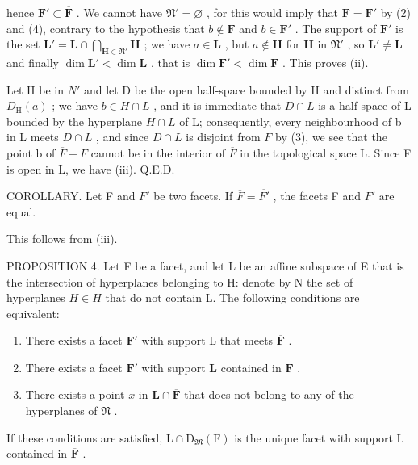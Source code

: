 hence \(\mathbf{F}' \subset \overline{\mathbf{F}}\) . We cannot have \(\mathfrak{N}' = \varnothing\) , for this would imply that \(\mathbf{F} = \mathbf{F}'\) by (2) and (4), contrary to the hypothesis that \(b \notin \mathbf{F}\) and \(b \in \mathbf{F}'\) . The support of \(\mathbf{F}'\) is the set \(\mathbf{L}' = \mathbf{L} \cap \bigcap_{\mathbf{H} \in \mathfrak{N}'} \mathbf{H}\) ; we have \(a \in \mathbf{L}\) , but \(a \notin \mathbf{H}\) for \(\mathbf{H}\) in \(\mathfrak{N}'\) , so \(\mathbf{L}' \neq \mathbf{L}\) and finally \(\dim \mathbf{L}' < \dim \mathbf{L}\) , that is \(\dim \mathbf{F}' < \dim \mathbf{F}\) . This proves (ii).

Let H be in \(N'\) and let D be the open half-space bounded by H and distinct from \(D_{\mathrm{H}}(a)\) ; we have \(b \in H \cap L\) , and it is immediate that \(D \cap L\) is a half-space of L bounded by the hyperplane \(H \cap L\) of L; consequently, every neighbourhood of b in L meets \(D \cap L\) , and since \(D \cap L\) is disjoint from \(\overline{F}\) by (3), we see that the point b of \(\overline{F} - F\) cannot be in the interior of \(\overline{F}\) in the topological space L. Since F is open in L, we have (iii). Q.E.D.

COROLLARY. Let F and \(F'\) be two facets. If \(\overline{F} = \overline{F'}\) , the facets F and \(F'\) are equal.

This follows from (iii).

PROPOSITION 4. Let F be a facet, and let L be an affine subspace of E that is the intersection of hyperplanes belonging to H: denote by N the set of hyperplanes \(H \in H\) that do not contain L. The following conditions are equivalent:

\begin{enumerate}
\def\labelenumi{(\roman{enumi})}
\item
  There exists a facet \(\mathbf{F}'\) with support L that meets \(\overline{\mathbf{F}}\) .
\item
  There exists a facet \(\mathbf{F}'\) with support \(\mathbf{L}\) contained in \(\overline{\mathbf{F}}\) .
\item
  There exists a point \(x\) in \(\mathbf{L} \cap \overline{\mathbf{F}}\) that does not belong to any of the hyperplanes of \(\mathfrak{N}\) .
\end{enumerate}

If these conditions are satisfied, \(\mathrm{L} \cap \mathrm{D}_{\mathfrak{M}}(\mathrm{F})\) is the unique facet with support \(\mathrm{L}\) contained in \(\overline{\mathbf{F}}\) .

